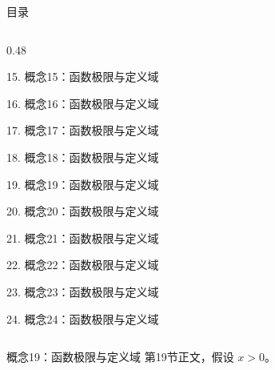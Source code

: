 \documentclass[aspectratio=169,10pt,fontset=fandol]{ctexbeamer}
\begin{document}
\begin{frame}[t,fragile]{目录}
\begin{columns}[T,onlytextwidth]
\begin{column}{0.48\textwidth}
{\color{black}\small 15. 概念15：函数极限与定义域\par}\vspace{0.22em}
{\color{black}\small 16. 概念16：函数极限与定义域\par}\vspace{0.22em}
{\color{black}\small 17. 概念17：函数极限与定义域\par}\vspace{0.22em}
{\color{black}\small 18. 概念18：函数极限与定义域\par}\vspace{0.22em}
{\color{blue}\small 19. 概念19：函数极限与定义域\par}\vspace{0.22em}
{\color{gray!40}\small 20. 概念20：函数极限与定义域\par}\vspace{0.22em}
{\color{gray!40}\small 21. 概念21：函数极限与定义域\par}\vspace{0.22em}
{\color{gray!40}\small 22. 概念22：函数极限与定义域\par}\vspace{0.22em}
{\color{gray!40}\small 23. 概念23：函数极限与定义域\par}\vspace{0.22em}
{\color{gray!40}\small 24. 概念24：函数极限与定义域\par}\vspace{0.22em}
\end{column}
\end{columns}
\end{frame}
\begin{frame}[t,fragile]{概念19：函数极限与定义域}
\normalsize
{\normalsize
第19节正文，假设 $x>0$。
}
\end{frame}
\end{document}
